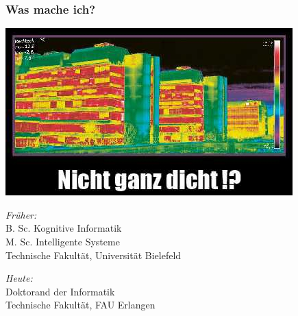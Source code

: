 \documentclass[aspectratio=169,x11names]{beamer}
\begin{document}

\begin{frame}
\frametitle{Was mache ich?}

\begin{multicols}{2}

\begin{center}
\includegraphics[scale=0.45]{images/thermopostkarte.jpg} 
\end{center}

\columnbreak

\textit{Früher:}\\
B. Sc.  \glqq Kognitive Informatik\grqq\\
M. Sc.  \glqq Intelligente Systeme\grqq\\
Technische Fakultät, Universität Bielefeld\\
\medskip

\textit{Heute:}\\
Doktorand der Informatik\\
Technische Fakultät, FAU Erlangen
\end{multicols}
\end{frame}

\end{document}
